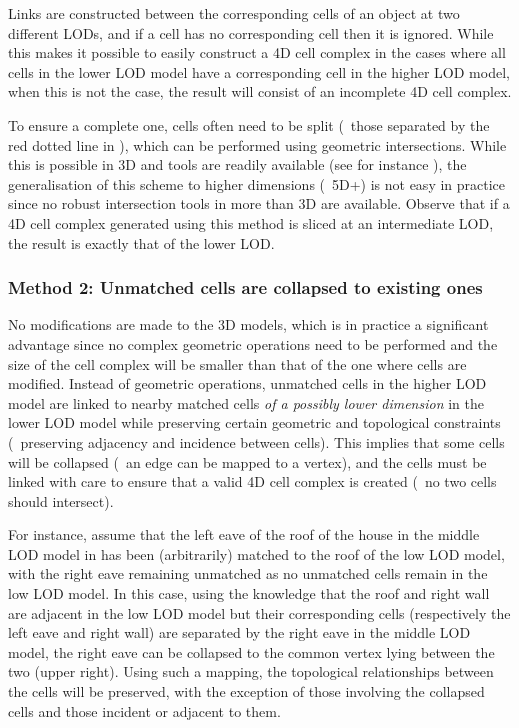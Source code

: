 Links are constructed between the corresponding cells of an object at two different LODs, and if a cell has no corresponding cell then it is ignored.
While this makes it possible to easily construct a 4D cell complex in the cases where all cells in the lower LOD model have a corresponding cell in the higher LOD model, when this is not the case, the result will consist of an incomplete 4D cell complex.

To ensure a complete one, cells often need to be split (\eg\ those separated by the red dotted line in ), which can be performed using geometric intersections.
While this is possible in 3D and tools are readily available (see for instance \citet{Granados03,Hachenberger06}), the generalisation of this scheme to higher dimensions (\ie\ 5D+) is not easy in practice since no robust intersection tools in more than 3D are available.
Observe that if a 4D cell complex generated using this method is sliced at an intermediate LOD, the result is exactly that of the lower LOD\@.


\subsubsection{Method 2: Unmatched cells are collapsed to existing ones}
\label{sss:method2}

No modifications are made to the 3D models, which is in practice a significant advantage since no complex geometric operations need to be performed and the size of the cell complex will be smaller than that of the one where cells are modified.
Instead of geometric operations, unmatched cells in the higher LOD model are linked to nearby matched cells \emph{of a possibly lower dimension} in the lower LOD model while preserving certain geometric and topological constraints (\eg\ preserving adjacency and incidence between cells).
This implies that some cells will be collapsed (\eg\ an edge can be mapped to a vertex), and the cells must be linked with care to ensure that a valid 4D cell complex is created (\eg\ no two cells should intersect).

For instance, assume that the left eave of the roof of the house in the middle LOD model in  has been (arbitrarily) matched to the roof of the low LOD model, with the right eave remaining unmatched as no unmatched cells remain in the low LOD model.
In this case, using the knowledge that the roof and right wall are adjacent in the low LOD model but their corresponding cells (respectively the left eave and right wall) are separated by the right eave in the middle LOD model, the right eave can be collapsed to the common vertex lying between the two (upper right).
Using such a mapping, the topological relationships between the cells will be preserved, with the exception of those involving the collapsed cells and those incident or adjacent to them.

